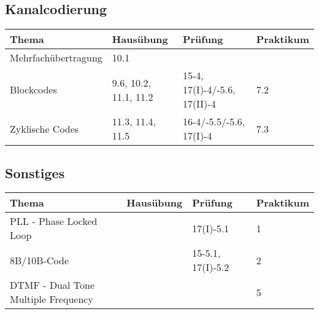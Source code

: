\subsection{Kanalcodierung}
	\begin{tabular}{|p{9cm}|p{2.5cm}|p{3.9cm}|p{1.6cm}|}
	\hline
	\textbf{Thema} & \textbf{Hausübung} & \textbf{Prüfung} & \textbf{Praktikum} \\ 
	\hline
	\hline
	Mehrfachübertragung & 10.1 & & \\
	\hline
	Blockcodes & 9.6, 10.2, 11.1, 11.2 & 15-4, 17(I)-4/-5.6, 17(II)-4 & 7.2\\
	\hline
	Zyklische Codes & 11.3, 11.4, 11.5 & 16-4/-5.5/-5.6, 17(I)-4& 7.3\\
	\hline
	\end{tabular}
\subsection{Sonstiges}
	\begin{tabular}{|p{9cm}|p{2.5cm}|p{3.9cm}|p{1.6cm}|}
	\hline  
	\textbf{Thema} & \textbf{Hausübung} & \textbf{Prüfung} & \textbf{Praktikum} \\ 
	\hline
	\hline
	PLL - Phase Locked Loop	& & 17(I)-5.1& 1 \\
	\hline
	8B/10B-Code & & 15-5.1, 17(I)-5.2 & 2 \\
	\hline
	DTMF - Dual Tone Multiple Frequency & & & 5\\
	\hline
	\end{tabular}
